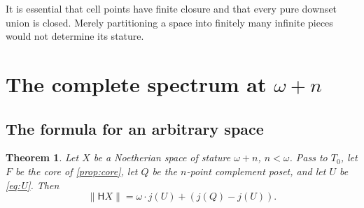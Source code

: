 \documentclass[11pt,a4paper]{article}
\newtheorem{theorem}{Theorem}[section]
\theoremstyle{definition}
\newcommand{\HH}{\mathsf H}
\newcommand{\st}[1]{\lVert #1\rVert}
\numberwithin{equation}{section}
\begin{document}
It is essential that cell points have finite closure and that every
pure downset union is closed.  Merely partitioning a space into finitely
many infinite pieces would not determine its stature.

\section{The complete spectrum at \texorpdfstring{$\omega+n$}{omega+n}}
\label{sec:spectrum}

\subsection{The formula for an arbitrary space}

\begin{theorem}\label{thm:formula}
Let $X$ be a Noetherian space of stature $\omega+n$, $n<\omega$.
Pass to $T_0$, let $F$ be the core of \cref{prop:core}, let $Q$ be the
$n$-point complement poset, and let $U$ be \eqref{eq:U}.  Then
\begin{equation}\label{eq:spectrumformula}
 \st{\HH X}=\omega\cdot j(U)+(j(Q)-j(U)).
\end{equation}
\end{theorem}
\end{document}

